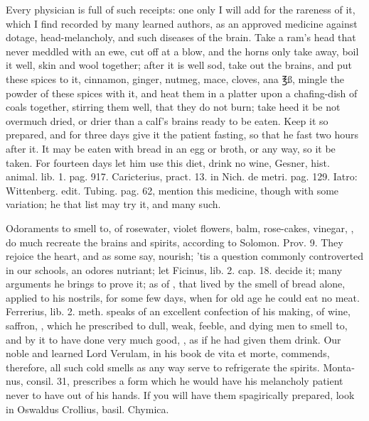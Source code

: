 Every physician is full of such receipts: one only I will add for the
rareness of it, which I find recorded by many learned authors, as an
approved medicine against dotage, head-melancholy, and such diseases of
the brain. Take a ram's head that never meddled with an ewe, cut
off at a blow, and the horns only take away, boil it well, skin and
wool together; after it is well sod, take out the brains, and put these
spices to it, cinnamon, ginger, nutmeg, mace, cloves, ana ℥ß, mingle
the powder of these spices with it, and heat them in a platter upon a
chafing-dish of coals together, stirring them well, that they do not
burn; take heed it be not overmuch dried, or drier than a calf's brains
ready to be eaten. Keep it so prepared, and for three days give it the
patient fasting, so that he fast two hours after it. It may be eaten
with bread in an egg or broth, or any way, so it be taken. For fourteen
days let him use this diet, drink no wine, \etc{} Gesner, hist. animal.
lib. 1. pag. 917. Caricterius, pract. 13. in Nich. de metri. pag. 129.
Iatro: Wittenberg. edit. Tubing. pag. 62, mention this medicine, though
with some variation; he that list may try it, and many such.

Odoraments to smell to, of rosewater, violet flowers, balm, rose-cakes,
vinegar, \etc{}, do much recreate the brains and spirits, according to
Solomon. Prov.  9. They rejoice the heart, and as some say,
nourish; 'tis a question commonly controverted in our schools, an
odores nutriant; let Ficinus, lib. 2. cap. 18. decide it; many
arguments he brings to prove it; as of \Democritus{}, that lived by the
smell of bread alone, applied to his nostrils, for some few days, when
for old age he could eat no meat. Ferrerius, lib. 2. meth. speaks of an
excellent confection of his making, of wine, saffron, \etc{}, which he
prescribed to dull, weak, feeble, and dying men to smell to, and by it
to have done very much good, , as
if he had given them drink. Our noble and learned Lord Verulam,
in his book \textlatin{de vita et morte}, commends, therefore, all such cold smells
as any way serve to refrigerate the spirits. \textlatin{Montanus, consil. 31},
prescribes a form which he would have his melancholy patient never to
have out of his hands. If you will have them spagirically prepared,
look in \textlatin{Oswaldus Crollius, basil. Chymica}.

